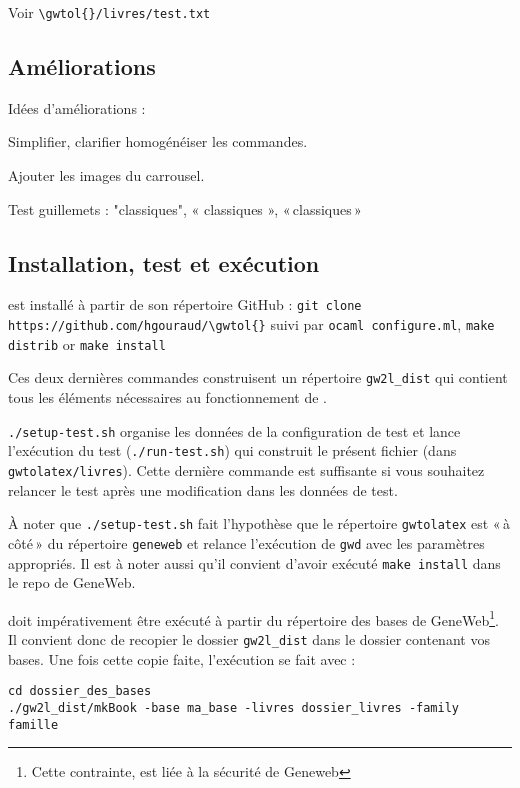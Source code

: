 Voir \verb|\gwtol{}/livres/test.txt|

\subsection{Améliorations}

Idées d'améliorations :
\begin{description}
\item Simplifier, clarifier homogénéiser les commandes.
\item Ajouter les images du carrousel.
\item Test guillemets : "classiques", « classiques », «\,classiques\,»
\end{description}

\subsection{Installation, test et exécution}

\gwtol{} est installé à partir de son répertoire GitHub :
\verb|git clone https://github.com/hgouraud/\gwtol{}|
suivi par
\verb|ocaml configure.ml|, \verb|make distrib| or \verb|make install|

Ces deux dernières commandes construisent un répertoire \verb|gw2l_dist| qui
contient tous les éléments nécessaires au fonctionnement de \gwtol{}.

\verb|./setup-test.sh| organise les données de la configuration de test et
lance l'exécution du test (\verb|./run-test.sh|) qui construit le présent
fichier (dans \verb|gwtolatex/livres|). Cette dernière commande est
suffisante si vous souhaitez relancer le test après une modification
dans les données de test.

À noter que \verb|./setup-test.sh| fait l'hypothèse que le répertoire
\verb|gwtolatex| est «\,à côté\,» du répertoire \verb|geneweb| et relance
l'exécution de \verb|gwd| avec les paramètres appropriés. Il est à noter
aussi qu'il convient d'avoir exécuté \verb|make install| dans le repo de GeneWeb.

\gwtol{} doit impérativement être exécuté à partir du répertoire des bases de
GeneWeb\footnote{Cette contrainte, est liée à la sécurité de Geneweb}.
Il convient donc de recopier le dossier \verb|gw2l_dist| dans le
dossier contenant vos bases. Une fois cette copie faite, l'exécution se
fait avec :
\begin{verbatim}
cd dossier_des_bases
./gw2l_dist/mkBook -base ma_base -livres dossier_livres -family famille
\end{verbatim}

